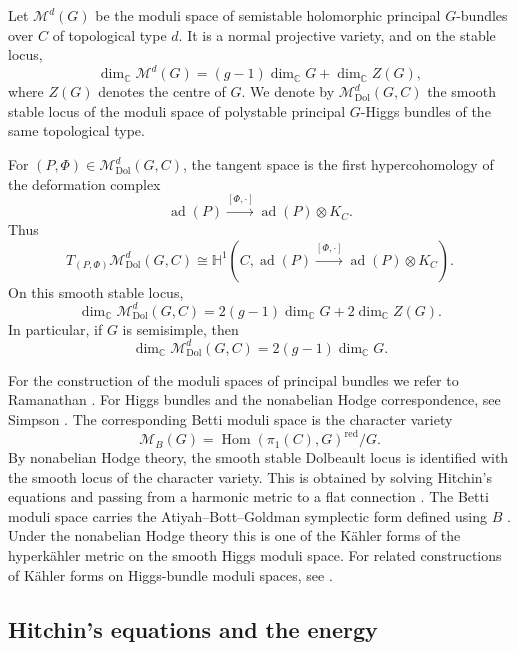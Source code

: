 \documentclass[11pt,reqno]{amsart}
\numberwithin{equation}{section}
\theoremstyle{plain}
\theoremstyle{definition}
\theoremstyle{remark}
\begin{document}
Let
\(
        \mathcal M^d(G)
\)
be the moduli space of semistable holomorphic principal \(G\)-bundles over
\(C\) of topological type \(d\). It is a normal projective variety, and on the stable locus,
\[
        \dim_{\mathbb C}\mathcal M^d(G)
        =
        (g-1)\dim_{\mathbb C}G+\dim_{\mathbb C}Z(G),
\]
where \(Z(G)\) denotes the centre of \(G\).  We denote by
\(
        \mathcal M_{\mathrm{Dol}}^d(G,C)
\)
the smooth stable locus of the moduli space of polystable principal
\(G\)-Higgs bundles of the same topological type.

For \((P,\Phi) \in \mathcal M_{\mathrm{Dol}}^d(G,C)\), the tangent space is the first
hypercohomology of the deformation complex
\[
        \operatorname{ad}(P)
        \xrightarrow{[\Phi,\cdot]}
        \operatorname{ad}(P)\otimes K_C.
\]
Thus
\[
        T_{(P,\Phi)}\mathcal M_{\mathrm{Dol}}^d(G,C)
        \cong
        \mathbb H^1\left(
        C,\operatorname{ad}(P)
        \xrightarrow{[\Phi,\cdot]}
        \operatorname{ad}(P)\otimes K_C
        \right).
\]
On this smooth stable locus,
\[
        \dim_{\mathbb C}\mathcal M_{\mathrm{Dol}}^d(G,C)
        =
        2(g-1)\dim_{\mathbb C}G+2\dim_{\mathbb C}Z(G).
\]
In particular, if \(G\) is semisimple, then
\[
        \dim_{\mathbb C}\mathcal M_{\mathrm{Dol}}^d(G,C)
        =
        2(g-1)\dim_{\mathbb C}G.
\]

For the construction of the moduli spaces of principal bundles we refer to
Ramanathan \cite{Ramanathan, Ramanathan1996}. For Higgs bundles and the nonabelian Hodge
correspondence, see Simpson \cite{Simpson1992,Simpson1994I,Simpson1994II}. The corresponding Betti moduli space is the character variety
\[
        \mathcal M_B(G)
        =
        \operatorname{Hom}(\pi_1(C),G)^{\mathrm{red}}/G.
\]
By nonabelian Hodge theory, the smooth stable Dolbeault locus is identified
with the smooth locus of the character variety. This is obtained by solving
Hitchin's equations and passing from a harmonic metric to a flat connection
\cite{Hitchin1987,Donaldson,Corlette,Simpson1992,Simpson1994I,Simpson1994II}.
The Betti moduli space carries the Atiyah--Bott--Goldman symplectic form
defined using \(B\) \cite{AB,Goldman}. Under the nonabelian Hodge theory this is
one of the Kähler forms of the hyperkähler metric on the smooth Higgs moduli
space. For related constructions of Kähler forms on Higgs-bundle moduli spaces, see
\cite{BiswasSchumacher}.

\subsection{Hitchin's equations and the energy}
\end{document}
